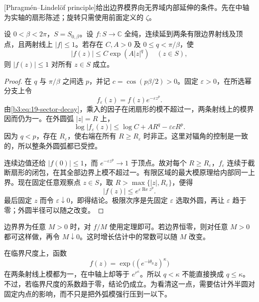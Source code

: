[Phragmén--Lindelöf principle]给出边界模界向无界域内部延伸的条件。先在中轴为实轴的扇形陈述；旋转只需使用前面定义的 \(\zeta\)。

\begin{theorem}\label{b3:thm:19-pl}
设 \(0<\beta<2\pi\)，\(S=S_{0,\beta}\)。设 \(f:S\to\mathbb C\) 全纯，连续延到两条有限边界射线及顶点，且两射线上 \(|f|\le1\)。若存在 \(C,A>0\) 及 \(0\le q<\pi/\beta\)，使
\[
 |f(z)|\le C\exp(A|z|^q)\quad(z\in S),
\]
则 \(|f(z)|\le1\) 对所有 \(z\in S\) 成立。
\end{theorem}
\begin{proof}
在 \(q\) 与 \(\pi/\beta\) 之间选 \(p\)，并记 \(c=\cos(p\beta/2)>0\)。固定 \(\varepsilon>0\)，在所选幂分支上令
\[
 f_\varepsilon(z)=f(z)e^{-\varepsilon z^p}.
\]
由\eqref{b3:eq:19-sector-decay}，乘入的因子在闭扇形的模不超过一，两条射线上的模界因而仍为一。在外圆弧 \(|z|=R\) 上，
\[
 \log|f_\varepsilon(z)|
 \le\log C+AR^q-\varepsilon cR^p.
\]
因为 \(q<p\)，存在 \(R_\varepsilon\)，使右端在所有 \(R\ge R_\varepsilon\) 时非正。这里对辐角的控制是一致的，所以整条外圆弧都已受控。

连续边值还给 \(|f(0)|\le1\)，而 \(e^{-\varepsilon z^p}\to1\) 于顶点。故对每个 \(R\ge R_\varepsilon\)，\(f_\varepsilon\) 连续于截断扇形的闭包，在其全部边界上模不超过一。有限区域的最大模原理给内部同一上界。现在固定任意观察点 \(z\in S\)，取 \(R>\max\{|z|,R_\varepsilon\}\)，便得
\[
 |f(z)|\le e^{\varepsilon\operatorname{Re}z^p}.
\]
最后固定 \(z\) 而令 \(\varepsilon\downarrow0\)，即得结论。极限次序是先固定 \(\varepsilon\) 选取外圆，再让 \(\varepsilon\) 趋于零；外圆半径可以随之改变。
\end{proof}

边界界为任意 \(M>0\) 时，对 \(f/M\) 使用定理即可。若边界恒零，则对任意 \(M>0\) 都可这样做，再令 \(M\downarrow0\)。这时增长估计中的常数可以随 \(M\) 改变。

\ProseParagraphBreak

在临界尺度上，函数
\[
 f(z)=\exp\bigl((e^{-\mathrm i\theta_0}z)^\kappa\bigr)
\]
在两条射线上模都为一，在中轴上却等于 \(e^{r^\kappa}\)。所以 \(q<\kappa\) 不能直接换成 \(q\le\kappa\)。不过，若临界尺度的系数趋于零，结论仍成立。为看清这一点，需要估计外半圆对固定内点的影响，而不只是把外弧模强行压到一以下。

